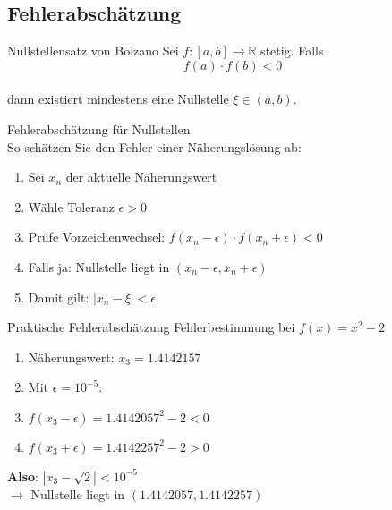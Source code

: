 \subsection{Fehlerabschätzung}

\begin{lemma}{Nullstellensatz von Bolzano}
Sei $f:[a,b] \rightarrow \mathbb{R}$ stetig. Falls 
\vspace{-1mm}\\
$$f(a) \cdot f(b) < 0$$ 
\vspace{-3mm}\\
dann existiert mindestens eine Nullstelle $\xi \in (a,b)$.
\end{lemma}

\begin{KR}{Fehlerabschätzung für Nullstellen}\\
So schätzen Sie den Fehler einer Näherungslösung ab:
\begin{enumerate}
    \item Sei $x_n$ der aktuelle Näherungswert
    \item Wähle Toleranz $\epsilon > 0$
    \item Prüfe Vorzeichenwechsel: $f(x_n-\epsilon) \cdot f(x_n+\epsilon) < 0$
    \item Falls ja: Nullstelle liegt in $(x_n-\epsilon, x_n+\epsilon)$
    \item Damit gilt: $|x_n-\xi| < \epsilon$
\end{enumerate}
\end{KR}

\begin{example2}{Praktische Fehlerabschätzung} Fehlerbestimmung bei $f(x)=x^2-2$
    \vspace{-1mm}\\
    \begin{minipage}[t]{0.6\textwidth}
        \vspace{-3mm}
        \begin{enumerate}
            \item Näherungswert: $x_3 = 1.4142157$
            \item Mit $\epsilon = 10^{-5}$:
            \item $f(x_3-\epsilon) = 1.4142057^2 - 2 < 0$
            \item $f(x_3+\epsilon) = 1.4142257^2 - 2 > 0$
        \end{enumerate}
    \end{minipage}
    \begin{minipage}[t]{0.35\textwidth}
        \textbf{Also}: $|x_3-\sqrt{2}| < 10^{-5}$
        \vspace{-1mm}\\
        $\rightarrow$ Nullstelle liegt in $(1.4142057, 1.4142257)$
    \end{minipage}
\end{example2}


